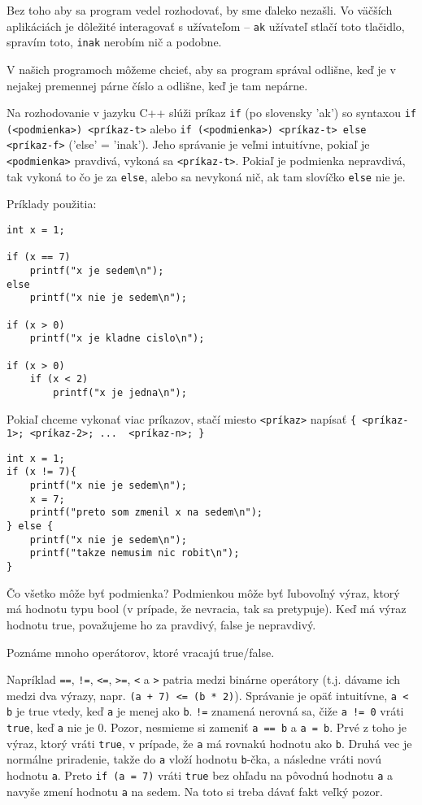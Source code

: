 
Bez toho aby sa program vedel rozhodovať, by sme ďaleko nezašli. Vo väčších
aplikáciách je dôležité interagovať s užívateľom -- \verb!ak! užívateľ stlačí
toto tlačidlo, spravím toto, \verb!inak!  nerobím nič a podobne. 

V našich programoch môžeme chcieť, aby sa program správal odlišne, keď je v
nejakej premennej párne číslo a odlišne, keď je tam nepárne.

Na rozhodovanie v jazyku C++ slúži príkaz \verb!if! (po slovensky 'ak') so
syntaxou \verb!if (<podmienka>) <príkaz-t>! alebo \verb!if (<podmienka>) <príkaz-t> else <príkaz-f>!
('else' = 'inak'). Jeho správanie je veľmi intuitívne, pokiaľ je
\verb!<podmienka>! pravdivá, vykoná sa \verb!<príkaz-t>!.  Pokiaľ je podmienka
nepravdivá, tak vykoná to čo je za \verb!else!, alebo sa nevykoná nič, ak tam
slovíčko \verb!else! nie je.

Príklady použitia:
\begin{lstlisting}
int x = 1;

if (x == 7) 
    printf("x je sedem\n");
else
    printf("x nie je sedem\n");

if (x > 0)
    printf("x je kladne cislo\n");

if (x > 0)
    if (x < 2)
        printf("x je jedna\n");
\end{lstlisting}

Pokiaľ chceme vykonať viac príkazov, stačí miesto \verb!<príkaz>! napísať \verb!{ <príkaz-1>; <príkaz-2>; ...  <príkaz-n>; }!
\begin{lstlisting}
int x = 1;
if (x != 7){
    printf("x nie je sedem\n");
    x = 7;
    printf("preto som zmenil x na sedem\n");
} else {
    printf("x nie je sedem\n");
    printf("takze nemusim nic robit\n");
}
\end{lstlisting}

\medskip

Čo všetko môže byť podmienka? Podmienkou môže byť ľubovoľný výraz, ktorý má
hodnotu typu bool (v prípade, že nevracia, tak sa pretypuje).  Keď má výraz
hodnotu true, považujeme ho za pravdivý, false je nepravdivý.

Poznáme mnoho operátorov, ktoré vracajú true/false. 

Napríklad \verb'==', \verb'!=', \verb'<=', \verb'>=', \verb'<' a \verb'>' patria medzi binárne
operátory (t.j. dávame ich medzi dva výrazy, napr. \verb!(a + 7) <= (b * 2)!).
Správanie je opäť intuitívne, \verb'a < b' je true vtedy, keď \verb!a! je menej ako
\verb!b!.  \verb'!=' znamená nerovná sa, čiže \verb'a != 0' vráti \verb!true!, keď
\verb!a! nie je 0. Pozor, nesmieme si zameniť \verb'a == b' a \verb'a = b'.  Prvé z
toho je výraz, ktorý vráti \verb!true!, v prípade, že \verb!a! má rovnakú hodnotu
ako \verb!b!. Druhá vec je normálne priradenie, takže do \verb!a! vloží hodnotu \verb!b!-čka,
a následne vráti novú hodnotu \verb!a!. Preto \verb!if (a = 7)! vráti \verb!true!
bez ohľadu na pôvodnú hodnotu \verb!a! a navyše zmení hodnotu \verb!a! na sedem.  Na toto
si treba dávať fakt veľký pozor. 

